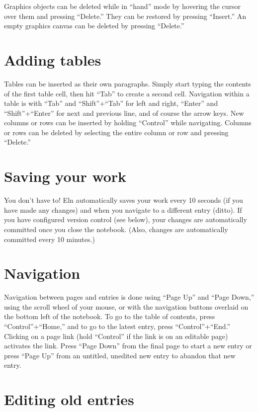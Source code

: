 \documentclass[11pt]{report}
\begin{document}
Graphics objects can be deleted while in ``hand'' mode by hovering the
cursor over them and pressing ``Delete.'' They can be restored by
pressing ``Insert.'' An empty graphics canvas can be deleted by
pressing ``Delete.''

\section{Adding tables}

Tables can be inserted as their own paragraphs. Simply start typing
the contents of the first table cell, then hit ``Tab'' to create a
second cell. Navigation
within a table is with ``Tab'' and ``Shift''+``Tab'' for left and
right, ``Enter'' and ``Shift''+``Enter'' for next and previous line,
and of course the arrow keys. New columns or rows can be inserted by
holding ``Control'' while navigating. Columns or rows can be deleted
by selecting the entire column or row and pressing ``Delete.''

\section{Saving your work}

You don't have to! Eln automatically saves your work every 10 seconds
(if you have made any changes) and when you navigate to a different
entry (ditto). If you have configured version control (see below),
your changes are automatically committed once you close the
notebook. (Also, changes are automatically committed every 10
minutes.)

\section{Navigation}

Navigation between pages and entries is done using ``Page Up'' and
``Page Down,'' using the scroll wheel of your mouse, or with the
navigation buttons overlaid on the bottom left of the notebook. To go
to the table of contents, press ``Control''+``Home,'' and to go to the
latest entry, press ``Control''+``End.'' Clicking on a page link (hold
``Control'' if the link is on an editable page) activates the
link. Press ``Page Down'' from the final page to start a new entry or
press ``Page Up'' from an untitled, unedited new entry to abandon that
new entry.

\section{Editing old entries}
\end{document}
